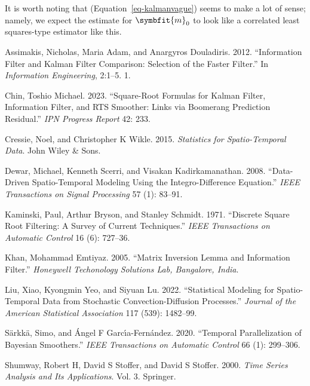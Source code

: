 \documentclass[
]{report}
\newlength{\cslhangindent}
\newenvironment{CSLReferences}[2] %
 {\begin{list}{}{%
  \setlength{\itemindent}{0pt}
  \setlength{\leftmargin}{0pt}
  \setlength{\parsep}{0pt}
  \ifodd #1
   \setlength{\leftmargin}{\cslhangindent}
   \setlength{\itemindent}{-1\cslhangindent}
  \fi
  \setlength{\itemsep}{#2\baselineskip}}}
 {\end{list}}
\newcommand{\bv}[1]{\symbfit{#1}}
\theoremstyle{plain}
\theoremstyle{plain}
\theoremstyle{remark}
\begin{document}
It is worth noting that (Equation~\ref{eq-kalmanvague}) seems to make a
lot of sense; namely, we expect the estimate for \(\bv m_0\) to look
like a correlated least squares-type estimator like this.

\label{refs}
\begin{CSLReferences}{1}{0}
Assimakis, Nicholas, Maria Adam, and Anargyros Douladiris. 2012.
{``Information Filter and Kalman Filter Comparison: Selection of the
Faster Filter.''} In \emph{Information Engineering}, 2:1--5. 1.

Chin, Toshio Michael. 2023. {``Square-Root Formulas for Kalman Filter,
Information Filter, and RTS Smoother: Links via Boomerang Prediction
Residual.''} \emph{IPN Progress Report} 42: 233.

Cressie, Noel, and Christopher K Wikle. 2015. \emph{Statistics for
Spatio-Temporal Data}. John Wiley \& Sons.

Dewar, Michael, Kenneth Scerri, and Visakan Kadirkamanathan. 2008.
{``Data-Driven Spatio-Temporal Modeling Using the Integro-Difference
Equation.''} \emph{IEEE Transactions on Signal Processing} 57 (1):
83--91.

Kaminski, Paul, Arthur Bryson, and Stanley Schmidt. 1971. {``Discrete
Square Root Filtering: A Survey of Current Techniques.''} \emph{IEEE
Transactions on Automatic Control} 16 (6): 727--36.

Khan, Mohammad Emtiyaz. 2005. {``Matrix Inversion Lemma and Information
Filter.''} \emph{Honeywell Techonology Solutions Lab, Bangalore, India}.

Liu, Xiao, Kyongmin Yeo, and Siyuan Lu. 2022. {``Statistical Modeling
for Spatio-Temporal Data from Stochastic Convection-Diffusion
Processes.''} \emph{Journal of the American Statistical Association} 117
(539): 1482--99.

Särkkä, Simo, and Ángel F Garcı́a-Fernández. 2020. {``Temporal
Parallelization of Bayesian Smoothers.''} \emph{IEEE Transactions on
Automatic Control} 66 (1): 299--306.

Shumway, Robert H, David S Stoffer, and David S Stoffer. 2000.
\emph{Time Series Analysis and Its Applications}. Vol. 3. Springer.


\end{CSLReferences}
\end{document}
